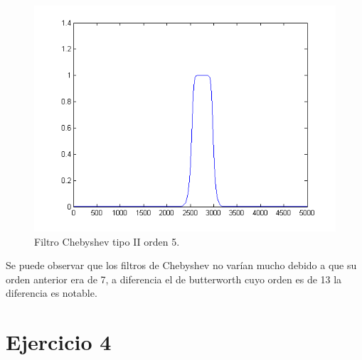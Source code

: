 \documentclass[10pt,a4paper,final]{article}
\begin{document}
\begin{figure}[h!]
\centering
  \caption{Filtro Chebyshev tipo II orden 5.}
  \label{fig:res120}
  \includegraphics[scale=0.5]{fig18.png}
    
\end{figure}

Se puede observar que los filtros de Chebyshev no varían mucho debido a que su orden anterior era de 7, a diferencia el de butterworth cuyo orden es de 13 la diferencia es notable.

\section{Ejercicio 4}
\end{document}
